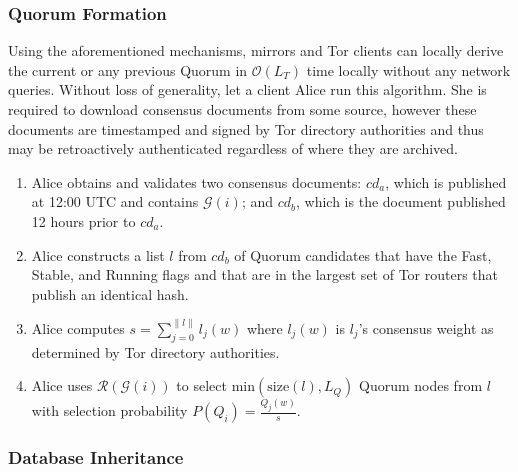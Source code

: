 \documentclass[USenglish,oneside,twocolumn]{article}
\begin{document}
\subsubsection{Quorum Formation} %
\label{sec:qFormation}

Using the aforementioned mechanisms, mirrors and Tor clients can locally derive the current or any previous Quorum in $ \mathcal{O}(L_{T}) $ time locally without any network queries. Without loss of generality, let a client Alice run this algorithm. She is required to download consensus documents from some source, however these documents are timestamped and signed by Tor directory authorities and thus may be retroactively authenticated regardless of where they are archived.

\begin{enumerate}
	\item Alice obtains and validates two consensus documents: $ \mathit{cd}_{a} $, which is published at 12:00 UTC and contains $ \mathcal{G}(i) $; and $ \mathit{cd}_{b} $, which is the document published 12 hours prior to $ \mathit{cd}_{a} $. 
	\item Alice constructs a list $ l $ from $ \mathit{cd}_{b} $ of Quorum candidates that have the Fast, Stable, and Running flags and that are in the largest set of Tor routers that publish an identical hash.
	\item Alice computes $ s = \sum_{j=0}^{\| l \|} l_{j}(w) $ where $ l_{j}(w) $ is $ l_{j} $'s consensus weight as determined by Tor directory authorities.
	\item Alice uses $ \mathcal{R}(\mathcal{G}(i)) $ to select $ \mathrm{min}(\mathrm{size}(l), L_{Q}) $ Quorum nodes from $ l $ with selection probability $ P (Q_{i}) = \frac{Q_{j}(w)}{s} $.
\end{enumerate}

\subsubsection{Database Inheritance} %
\end{document}
